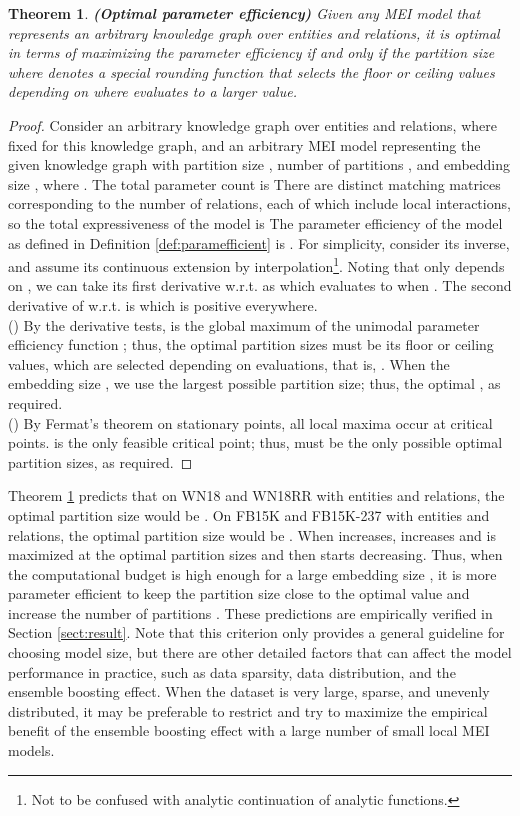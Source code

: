 \documentclass{ecai}
\theoremstyle{plain}  \newtheorem{thm}{Theorem}  \newtheorem{lem}[thm]{Lemma}  \newtheorem{prop}[thm]{Proposition}
\theoremstyle{remark}  \newtheorem*{rem}{Remark}
\begin{document}
\begin{thm} \textbf{\textit{(Optimal parameter efficiency)}} \label{thm:optimalefficiency}
	Given any MEI model that represents an arbitrary knowledge graph over  entities and  relations, it is optimal in terms of maximizing the parameter efficiency  if and only if the partition size  where  denotes a special rounding function that selects the floor or ceiling values depending on where  evaluates to a larger value.
\end{thm}

\begin{proof}
	Consider an arbitrary knowledge graph over  entities and  relations, where  fixed for this knowledge graph, and an arbitrary MEI model representing the given knowledge graph with partition size , number of partitions , and embedding size , where . The total parameter count is  There are  distinct matching matrices corresponding to the number of relations, each of which include  local interactions, so the total expressiveness of the model is  The parameter efficiency of the model as defined in Definition \ref{def:paramefficient} is . For simplicity, consider its inverse,  and assume its continuous extension by interpolation\footnote{Not to be confused with analytic continuation of analytic functions.}. Noting that  only depends on , we can take its first derivative w.r.t.  as  which evaluates to  when . The second derivative of  w.r.t.  is  which is positive everywhere.\\
	() By the derivative tests,  is the global maximum of the unimodal parameter efficiency function ; thus, the optimal partition sizes must be its floor or ceiling values, which are selected depending on  evaluations, that is, . When the embedding size , we use the largest possible partition size; thus, the optimal , as required.\\
	() By Fermat's theorem on stationary points, all local maxima occur at critical points.  is the only feasible critical point; thus,  must be the only possible optimal partition sizes, as required.
\end{proof}

Theorem \ref{thm:optimalefficiency} predicts that on WN18 and WN18RR with  entities and relations, the optimal partition size would be . On FB15K and FB15K-237 with  entities and relations, the optimal partition size would be . When  increases,  increases and is maximized at the optimal partition sizes and then starts decreasing. Thus, when the computational budget is high enough for a large embedding size , it is more parameter efficient to keep the partition size  close to the optimal value and increase the number of partitions . These predictions are empirically verified in Section \ref{sect:result}. Note that this criterion only provides a general guideline for choosing model size, but there are other detailed factors that can affect the model performance in practice, such as data sparsity, data distribution, and the ensemble boosting effect. When the dataset is very large, sparse, and unevenly distributed, it may be preferable to restrict  and try to maximize the empirical benefit of the ensemble boosting effect with a large number  of small local MEI models.
\end{document}
